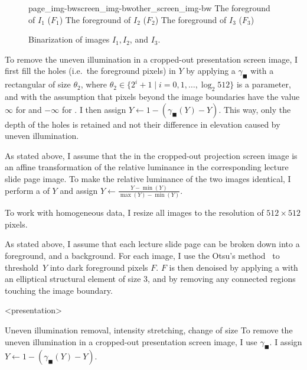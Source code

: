 \begin{description}
\begin{figure}
    \kern\floatsep
      {page_img-bw}{screen_img-bw}{other_screen_img-bw}%
      {The foreground of $I_1$ ($F_1$)}%
      {The foreground of $I_2$ ($F_2$)}%
      {The foreground of $I_3$ ($F_3$)}
    \caption{Binarization of images $I_1,I_2$, and $I_3$.}
    \label{fig:preprocessing-last}
  \end{figure}
  \item[Uneven illumination removal]
    To remove the uneven illumination in a cropped-out presentation screen
    image, I first fill the holes (i.e.\ the foreground pixels) in $Y$ by
    applying a  $\gamma_\blacksquare$ with a
    rectangular  of size $\theta_2$, where
    $\theta_2\in\{2^i+1\mid i=0,1,\ldots,\log_2 512\}$
    is a parameter, and with the assumption that pixels beyond the image
    boundaries have the value $\infty$ for  and
    $-\infty$ for . I then assign $Y\leftarrow
    1-(\gamma_\blacksquare(Y)-Y)$.  This way, only the depth of the holes is retained and
    not their difference in elevation caused by uneven illumination.
  \item[Intensity stretching]
    As stated above, I assume that the  in the
    cropped-out projection screen image is an affine transformation of the
    relative luminance in the corresponding lecture slide page image. To make
    the relative luminance of the two images identical, I perform a
     of $Y$ and assign
    $Y\leftarrow\frac{Y-\min(Y)}{\max(Y)-\min(Y)}$.
  \item[Change of size]
    To work with homogeneous data, I resize all images to the resolution of
    $512\times 512$ pixels.
  \item[Binarization]
    As stated above, I assume that each lecture slide page can be broken down
    into a foreground, and a background. For each image, I use
    the Otsu's method~\cite{otsu1979threshold} to threshold~$Y$ into dark
    foreground pixels $F$. $F$ is then denoised by applying a
     with an elliptical
    structural element of size 3, and by removing any connected regions
    touching the image boundary.

\mode
<presentation>

  \begin{frame}{Uneven illumination removal, intensity stretching, change of size}
    To remove the uneven illumination in a cropped-out presentation screen
    image, I use  $\gamma_\blacksquare$. I assign
    $Y\leftarrow 1-(\gamma_\blacksquare(Y)-Y)$.\pause


\end{frame}
\end{description}
